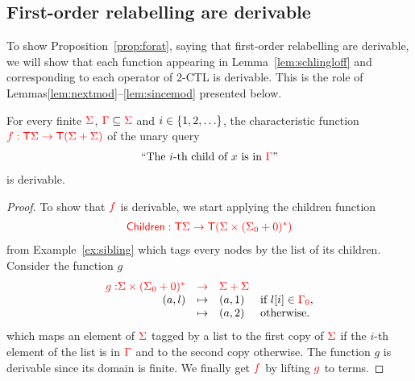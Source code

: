 \subsection{First-order relabelling are derivable}\label{sec:relabeling}
To show Proposition~\ref{prop:forat}, saying that first-order relabelling are derivable, we will show that each function appearing in Lemma~\ref{lem:schlingloff} and corresponding to each operator of 2-CTL is derivable. This is the role of Lemmas\ref{lem:nextmod}--\ref{lem:sincemod} presented below.
\begin{lemma}\label{lem:nextmod}
  For every finite ${\color{red}{\Sigma}}$, ${\color{red}{\Gamma}}\subseteq {\color{red}{\Sigma}}$ and $i \in \{1,2,\ldots\}$, the characteristic function ${\color{red}{f:{\color{red}{\mathsf T}}{\color{red}{\Sigma}}\to{\color{red}{\mathsf T}}({\color{red}{\Sigma}}+{\color{red}{\Sigma}})}}$ of the  unary query 
        \begin{align*}
\text{``The }i\text{-th child of }x\text{ is in }{\color{red}{\Gamma}}\text{''}
        \end{align*}
        is derivable.
\end{lemma}
\begin{proof}
To show that ${\color{red}{f}}$ is derivable, we start applying the children function \begin{align*}
{\color{red}{\mathsf{Children}:{\color{red}{\mathsf T}}{\color{red}{\Sigma}}\to {\color{red}{\mathsf T}}({\color{red}{\Sigma}}\times({\color{red}{\Sigma}}_0+0)^*)}}
\end{align*} from Example~\ref{ex:sibling} which tags every nodes by the list of its children. Consider the function $g$
$$\begin{array}{rlll}
{\color{red}{g:}}  {\color{red}{{\color{red}{\Sigma}}\times({\color{red}{\Sigma}}_0+0)^*}} &{\color{red}{\to}}& {\color{red}{\Sigma +\Sigma}}&\\
            (a,l)                           &
     \mapsto& (a,1)              &\text{if } l[i]\in{\color{red}{{\color{red}{\Gamma}}_0}}, \\
                    &   \mapsto& (a,2) &\text{otherwise.}   
\end{array}$$
which maps an element of ${\color{red}{\Sigma}}$ tagged by a list to the first copy of ${\color{red}{\Sigma}}$ if the $i$-th element of the list is in ${\color{red}{\Gamma}}$ and to the second copy otherwise. The function $g$ is derivable since its domain is finite.
We finally get ${\color{red}{f}}$ by lifting ${\color{red}{g}}$ to terms.
\end{proof}

